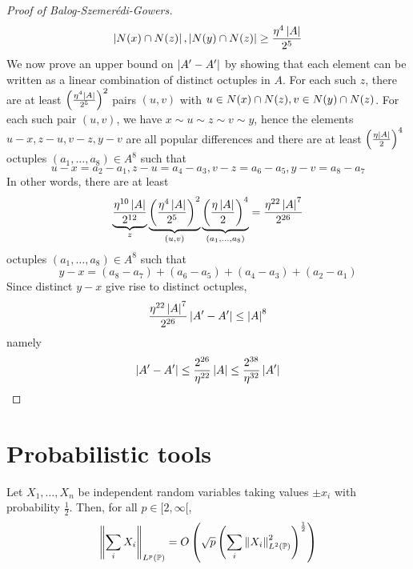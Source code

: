 \documentclass{article}
\begin{document}
\begin{proof}[Proof of Balog-Szemerédi-Gowers]
  $$\left\lvert N(x) \cap N(z)\right\rvert, \left\lvert N(y) \cap N(z)\right\rvert \ge \frac{\eta^4\left\lvert A\right\rvert}{2^5}$$
  We now prove an upper bound on $\left\lvert A' - A'\right\rvert$ by showing that each element can be written as a linear combination of distinct octuples in $A$. For each such $z$, there are at least $\left(\frac{\eta^4\left\lvert A\right\rvert}{2^5}\right)^2$ pairs $(u, v)$ with $u \in N(x) \cap N(z), v \in N(y) \cap N(z)$. For each such pair $(u, v)$, we have $x \sim u \sim z \sim v \sim y$, hence the elements $u - x, z - u, v - z, y - v$ are all popular differences and there are at least $\left(\frac{\eta\left\lvert A\right\rvert}2\right)^4$ octuples $(a_1, \dots, a_8) \in A^8$ such that
  $$u - x = a_2 - a_1, z - u = a_4 - a_3, v - z = a_6 - a_5, y - v = a_8 - a_7$$
  In other words, there are at least
  $$\underbrace{\frac{\eta^{10}\left\lvert A\right\rvert}{2^{12}}}_z
    \underbrace{\left(\frac{\eta^4\left\lvert A\right\rvert}{2^5}\right)^2}_{(u, v)}
    \underbrace{\left(\frac{\eta\left\lvert A\right\rvert}2\right)^4}_{(a_1, \dots, a_8)} = \frac{\eta^{22}\left\lvert A\right\rvert^7}{2^{26}}$$
  octuples $(a_1, \dots, a_8) \in A^8$ such that
  $$y - x = (a_8 - a_7) + (a_6 - a_5) + (a_4 - a_3) + (a_2 - a_1)$$
  Since distinct $y - x$ give rise to distinct octuples,
  $$\frac{\eta^{22}\left\lvert A\right\rvert^7}{2^{26}} \left\lvert A' - A'\right\rvert \le \left\lvert A\right\rvert^8$$
  namely
  $$\left\lvert A' - A'\right\rvert \le \frac{2^{26}}{\eta^{22}}\left\lvert A\right\rvert \le \frac{2^{38}}{\eta^{32}}\left\lvert A'\right\rvert$$
\end{proof}

\clearpage
\section{Probabilistic tools}

\begin{prop}
  Let $X_1, \dots, X_n$ be independent random variables taking values $\pm x_i$ with probability $\frac 12$. Then, for all $p \in [2, \infty[$,
  $$\left\lVert \sum_i X_i\right\rVert_{L^p(\mathbb P)} = O\left(\sqrt p\left(\sum_i \left\lVert X_i\right\rVert_{L^2(\mathbb P)}^2\right)^{\frac 12}\right)$$
\end{prop}

\newlec
\end{document}
